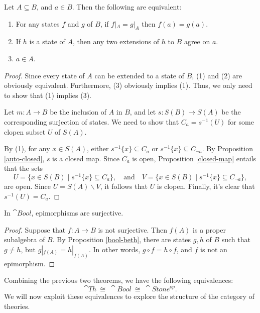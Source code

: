 
\begin{prop} Let $A\subseteq B$, and $a\in B$.  Then the following are
  equivalent:
\begin{enumerate}
\item For any states $f$ and $g$ of $B$, if $f|_A=g|_A$
  then $f(a)=g(a)$.
\item If $h$ is a state of $A$, then any two extensions of $h$ to $B$
  agree on $a$.
\item $a\in A$. \end{enumerate} \label{bool-beth} \end{prop}

\begin{proof} Since every state of $A$ can be extended to a state of
  $B$, (1) and (2) are obviously equivalent.  Furthermore, (3)
  obviously implies (1).  Thus, we only need to show that (1) implies
  (3).

  Let $m:A\to B$ be the inclusion of $A$ in $B$, and let $s:S(B)\to
  S(A)$ be the corresponding surjection of states.  We need to show
  that $C_a=s^{-1}(U)$ for some clopen subset $U$ of $S(A)$.

  By (1), for any $x\in S(A)$, either $s^{-1}\{ x\}\subseteq C_a$ or
  $s^{-1}\{ x\}\subseteq C_{\neg a}$.  By Proposition
  \ref{auto-closed}, $s$ is a closed map.  Since $C_a$ is open,
  Proposition \ref{closed-map} entails that the sets
  \[ U = \{ x\in S(B) \mid s^{-1}\{ x\} \subseteq C_a \} ,\quad
  \text{and} \quad V = \{ x\in S(B) \mid s^{-1}\{ x\} \subseteq
  C_{\neg a} \} ,\] are open.  Since $U=S(A)\backslash V$, it follows
  that $U$ is clopen.  Finally, it's clear that $s^{-1}(U)=C_a$.
\end{proof}

\begin{prop} In $\cat{Bool}$, epimorphisms are surjective. \end{prop}

\begin{proof} Suppose that $f:A\to B$ is not surjective.  Then $f(A)$
  is a proper subalgebra of $B$.  By Proposition \ref{bool-beth},
  there are states $g,h$ of $B$ such that $g\neq h$, but
  $g|_{f(A)}=h|_{f(A)}$.  In other words, $g\circ f=h\circ f$, and $f$
  is not an epimorphism.
\end{proof}


Combining the previous two theorems, we have the following
equivalences:
\[ \cat{Th} \: \cong \: \cat{Bool} \: \cong \: \cat{Stone}^{op} .\] We
will now exploit these equivalences to explore the structure of the
category of theories.

